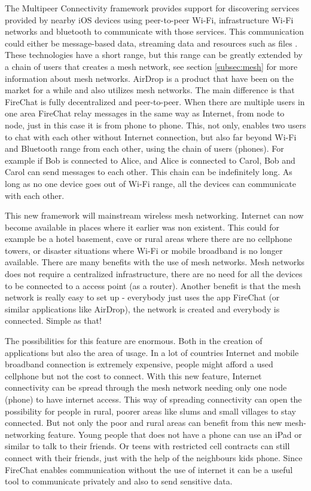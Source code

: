 The Multipeer Connectivity framework provides support for discovering services provided by nearby iOS devices using peer-to-peer Wi-Fi, infrastructure Wi-Fi networks and bluetooth to communicate with those services. This communication could either be message-based data, streaming data and resources such as files \cite{multipeer}. These technologies have a short range, but this range can be greatly extended by a chain of users that creates a mesh network, see section \ref{subsec:mesh} for more information about mesh networks. AirDrop is a product that have been on the market for a while and also utilizes mesh networks. The main difference is that FireChat is fully decentralized and peer-to-peer. When there are multiple users in one area FireChat relay messages in the same way as Internet, from node to node, just in this case it is from phone to phone.  This, not only, enables two users to chat with each other without Internet connection, but also far beyond Wi-Fi and Bluetooth range from each other, using the chain of users (phones). For example if Bob is connected to Alice, and Alice is connected to Carol, Bob and Carol can send messages to each other. This chain can be indefinitely long. As long as no one device goes out of Wi-Fi range, all the devices can communicate with each other. 

This new framework will mainstream wireless mesh networking. Internet can now become available in places where it earlier was non existent. This could for example be a hotel basement, cave or rural areas where there are no cellphone towers, or disaster situations where Wi-Fi or mobile broadband  is no longer available. There are many benefits with the use of mesh networks. Mesh networks does not require a centralized infrastructure, there are no need for all the devices to be connected to a access point (as a router). Another benefit is that the mesh network is really easy to set up - everybody just uses the app FireChat (or similar applications like AirDrop), the network is created and everybody is connected. Simple as that! 

The possibilities for this feature are enormous. Both in the creation of applications but also the area of usage. In a lot of countries Internet and mobile broadband connection is extremely expensive, people might afford a used cellphone but not the cost to connect. With this new feature, Internet connectivity can be spread through the mesh network needing only one node (phone) to have internet access. This way of spreading connectivity can open the possibility for people in rural, poorer areas like slums and small villages to stay connected. But not only the poor and rural areas can benefit from this new mesh-networking feature. Young people that does not have a phone can use an iPad or similar to talk to their friends. Or teens with restricted cell contracts can still connect with their friends, just with the help of the neighbours kids phone. Since FireChat enables communication without the use of internet it can be a useful tool to communicate privately and also to send sensitive data.
 

